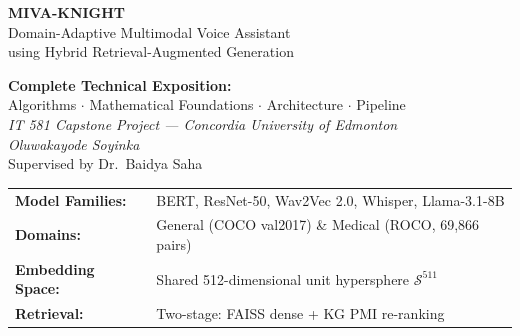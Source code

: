 \documentclass[12pt,a4paper]{article}
\theoremstyle{definition}
\theoremstyle{plain}
\theoremstyle{remark}
\newcommand{\Sph}{\mathcal{S}}
\begin{document}
\begin{titlepage}

  \vspace*{2.5cm}
  {\color{white}\fontsize{28}{34}\selectfont\bfseries
    \hspace{1cm}MIVA-KNIGHT}\\[0.3cm]
  {\color{white!80}\fontsize{16}{20}\selectfont
    \hspace{1cm}Domain-Adaptive Multimodal Voice Assistant}\\[0.1cm]
  {\color{white!70}\fontsize{14}{18}\selectfont
    \hspace{1cm}using Hybrid Retrieval-Augmented Generation}

  \vspace{1.5cm}
  \begin{center}
  \begin{tcolorbox}[width=0.82\textwidth, colback=white, colframe=NavyBlue,
    arc=6pt, boxrule=1.5pt]
    \centering
    \textbf{Complete Technical Exposition:}\\[4pt]
    Algorithms $\cdot$ Mathematical Foundations $\cdot$ Architecture $\cdot$ Pipeline\\[6pt]
    \small\textit{IT 581 Capstone Project — Concordia University of Edmonton}\\
    \textit{Oluwakayode Soyinka}\\[4pt]
    Supervised by Dr.\ Baidya Saha
  \end{tcolorbox}
  \end{center}

  \vfill
  \begin{center}
    \begin{tabular}{ll}
      \textbf{Model Families:} & BERT, ResNet-50, Wav2Vec 2.0, Whisper, Llama-3.1-8B \\
      \textbf{Domains:} & General (COCO val2017) \& Medical (ROCO, 69,866 pairs) \\
      \textbf{Embedding Space:} & Shared 512-dimensional unit hypersphere $\Sph^{511}$ \\
      \textbf{Retrieval:} & Two-stage: FAISS dense + KG PMI re-ranking \\
    \end{tabular}
  \end{center}
  \vspace{1.5cm}
\end{titlepage}
\end{document}

